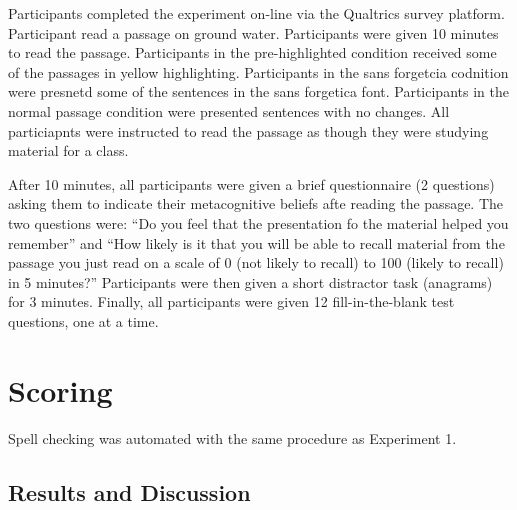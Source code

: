 \documentclass[english,doc]{apa6}
\begin{document}
Participants completed the experiment on-line via the Qualtrics survey platform. Participant read a passage on ground water. Participants were given 10 minutes to read the passage. Participants in the pre-highlighted condition received some of the passages in yellow highlighting. Participants in the sans forgetcia codnition were presnetd some of the sentences in the sans forgetica font. Participants in the normal passage condition were presented sentences with no changes. All particiapnts were instructed to read the passage as though they were studying material for a class.

After 10 minutes, all participants were given a brief questionnaire (2 questions) asking them to indicate their metacognitive beliefs afte reading the passage. The two questions were: \enquote{Do you feel that the presentation fo the material helped you remember} and \enquote{How likely is it that you will be able to recall material from the passage you just read on a scale of 0 (not likely to recall) to 100 (likely to recall) in 5 minutes?} Participants were then given a short distractor task (anagrams) for 3 minutes. Finally, all participants were given 12 fill-in-the-blank test questions, one at a time.

\hypertarget{scoring-1}{%
\section{Scoring}\label{scoring-1}}

Spell checking was automated with the same procedure as Experiment 1.

\hypertarget{results-and-discussion-1}{%
\subsection{Results and Discussion}\label{results-and-discussion-1}}
\end{document}
